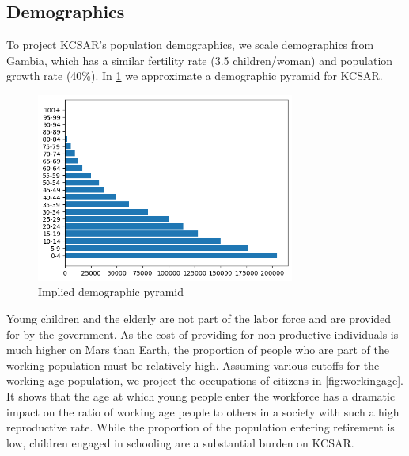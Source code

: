 \documentclass[fleqn,10pt]{Stylesheet} %
\begin{document}
\subsection{Demographics}
To project KCSAR's population demographics, we scale demographics from Gambia, which has a similar fertility rate (3.5 children/woman) and population growth rate (40\%). \cite{Gambia} In \ref{fig:demog_total} we approximate a demographic pyramid for KCSAR.

\begin{figure}
    \centering
    \includegraphics[width=85mm]{figures/fig_demopyr_t.png}
    \caption{Implied demographic pyramid}
    \label{fig:demog_total}
\end{figure}

Young children and the elderly are not part of the labor force and are provided for by the government. As the cost of providing for non-productive individuals is much higher on Mars than Earth, the proportion of people who are part of the working population must be relatively high. Assuming various cutoffs for the working age population, we project the occupations of citizens in \ref{fig:workingage}. It shows that the age at which young people enter the workforce has a dramatic impact on the ratio of working age people to others in a society with such a high reproductive rate. While the proportion of the population entering retirement is low, children engaged in schooling are a substantial burden on KCSAR. 
\end{document}
